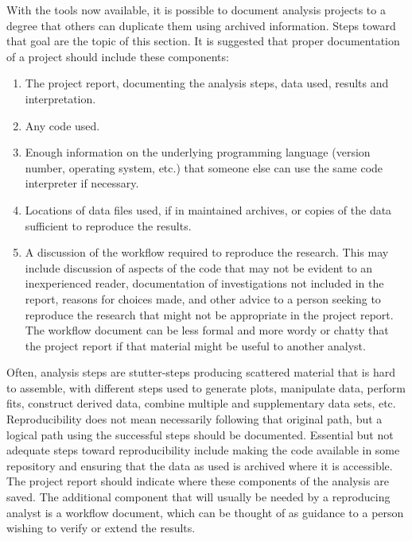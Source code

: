 \documentclass[12pt,english]{report}\usepackage[]{graphicx}\usepackage[]{color}
\begin{document}
With the tools now available, it is possible to document analysis
projects to a degree that others can duplicate them using archived
information. Steps toward that goal are the topic of this section.
It is suggested that proper documentation of a project should include
these components:
\begin{enumerate}
\item The project report, documenting the analysis steps, data used, results
and interpretation.
\item Any code used.
\item Enough information on the underlying programming language (version
number, operating system, etc.) that someone else can use the same
code interpreter if necessary.
\item Locations of data files used, if in maintained archives, or copies
of the data sufficient to reproduce the results.
\item A discussion of the workflow required to reproduce the research. This
may include discussion of aspects of the code that may not be evident
to an inexperienced reader, documentation of investigations not included
in the report, reasons for choices made, and other advice to a person
seeking to reproduce the research that might not be appropriate in
the project report. The workflow document can be less formal and more
wordy or chatty that the project report if that material might be
useful to another analyst.
\end{enumerate}
Often, analysis steps are stutter-steps producing scattered material
that is hard to assemble, with different steps used to generate plots,
manipulate data, perform fits, construct derived data, combine multiple
and supplementary data sets, etc. Reproducibility does not mean necessarily
following that original path, but a logical path using the successful
steps should be documented. Essential but not adequate steps toward
reproducibility include making the code available in some repository
and ensuring that the data as used is archived where it is accessible.
The project report should indicate where these components of the analysis
are saved. The additional component that will usually be needed by
a reproducing analyst is a workflow document, which can be thought
of as guidance to a person wishing to verify or extend the results.
\end{document}
